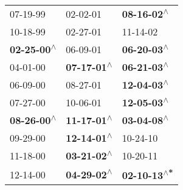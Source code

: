 \begin{supertabular}{lll}
                  07-19-99\textsuperscript{} &                   02-02-01\textsuperscript{} &   \textbf{08-16-02\textsuperscript{$\wedge$}} \\
                  10-18-99\textsuperscript{} &                   02-27-01\textsuperscript{} &                    11-14-02\textsuperscript{} \\
 \textbf{02-25-00\textsuperscript{$\wedge$}} &                   06-09-01\textsuperscript{} &   \textbf{06-20-03\textsuperscript{$\wedge$}} \\
                  04-01-00\textsuperscript{} &  \textbf{07-17-01\textsuperscript{$\wedge$}} &   \textbf{06-21-03\textsuperscript{$\wedge$}} \\
                  06-09-00\textsuperscript{} &                   08-27-01\textsuperscript{} &   \textbf{12-04-03\textsuperscript{$\wedge$}} \\
                  07-27-00\textsuperscript{} &                   10-06-01\textsuperscript{} &   \textbf{12-05-03\textsuperscript{$\wedge$}} \\
 \textbf{08-26-00\textsuperscript{$\wedge$}} &  \textbf{11-17-01\textsuperscript{$\wedge$}} &   \textbf{03-04-08\textsuperscript{$\wedge$}} \\
                  09-29-00\textsuperscript{} &  \textbf{12-14-01\textsuperscript{$\wedge$}} &                    10-24-10\textsuperscript{} \\
                  11-18-00\textsuperscript{} &  \textbf{03-21-02\textsuperscript{$\wedge$}} &                    10-20-11\textsuperscript{} \\
                  12-14-00\textsuperscript{} &  \textbf{04-29-02\textsuperscript{$\wedge$}} &  \textbf{02-10-13\textsuperscript{$\wedge$*}} \\
\end{supertabular}
